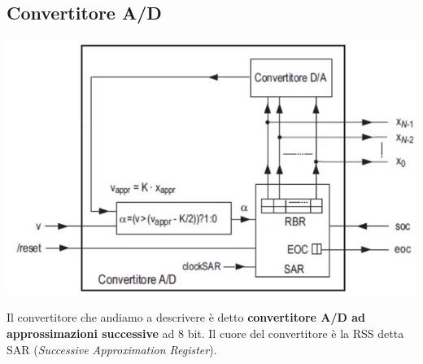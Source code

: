 \documentclass[11pt]{report}
\begin{document}
\subsection{Convertitore A/D}
\begin{center}
\includegraphics{img/235.PNG}
\end{center}
Il convertitore che andiamo a descrivere è detto \textbf{convertitore A/D ad approssimazioni successive} ad 8 bit. Il cuore del convertitore è la RSS detta SAR (\emph{Successive Approximation Register}). 
\end{document}
